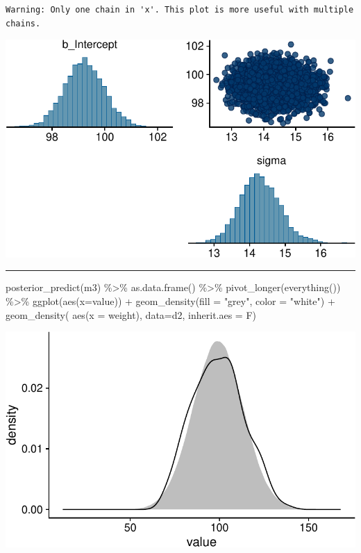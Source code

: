 \documentclass[
  letterpaper,
  DIV=11,
  numbers=noendperiod]{scrartcl}
\newenvironment{Shaded}{\begin{snugshade}}{\end{snugshade}}
\newcommand{\AttributeTok}[1]{\textcolor[rgb]{0.40,0.45,0.13}{#1}}
\newcommand{\FunctionTok}[1]{\textcolor[rgb]{0.28,0.35,0.67}{#1}}
\newcommand{\NormalTok}[1]{\textcolor[rgb]{0.00,0.23,0.31}{#1}}
\newcommand{\SpecialCharTok}[1]{\textcolor[rgb]{0.37,0.37,0.37}{#1}}
\newcommand{\StringTok}[1]{\textcolor[rgb]{0.13,0.47,0.30}{#1}}
\begin{document}
\begin{verbatim}
Warning: Only one chain in 'x'. This plot is more useful with multiple chains.
\end{verbatim}

\includegraphics[width=17.1875in,height=\textheight]{lecture02-1_files/figure-pdf/unnamed-chunk-22-1.pdf}

\begin{center}\rule{0.5\linewidth}{0.5pt}\end{center}

\begin{Shaded}
\begin{Highlighting}[]
\FunctionTok{posterior\_predict}\NormalTok{(m3) }\SpecialCharTok{\%\textgreater{}\%} 
  \FunctionTok{as.data.frame}\NormalTok{() }\SpecialCharTok{\%\textgreater{}\%} 
  \FunctionTok{pivot\_longer}\NormalTok{(}\FunctionTok{everything}\NormalTok{()) }\SpecialCharTok{\%\textgreater{}\%} 
  \FunctionTok{ggplot}\NormalTok{(}\FunctionTok{aes}\NormalTok{(}\AttributeTok{x=}\NormalTok{value)) }\SpecialCharTok{+}
  \FunctionTok{geom\_density}\NormalTok{(}\AttributeTok{fill =} \StringTok{"grey"}\NormalTok{, }\AttributeTok{color =} \StringTok{"white"}\NormalTok{) }\SpecialCharTok{+}
  \FunctionTok{geom\_density}\NormalTok{( }\FunctionTok{aes}\NormalTok{(}\AttributeTok{x =}\NormalTok{ weight), }\AttributeTok{data=}\NormalTok{d2, }\AttributeTok{inherit.aes =}\NormalTok{ F) }
\end{Highlighting}
\end{Shaded}

\includegraphics[width=17.1875in,height=\textheight]{lecture02-1_files/figure-pdf/unnamed-chunk-23-1.pdf}
\end{document}
